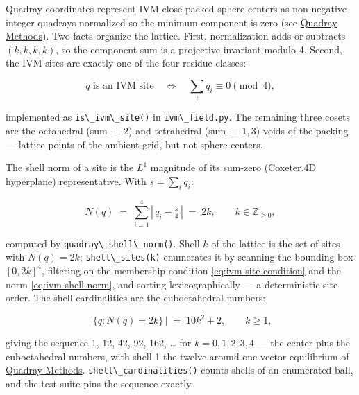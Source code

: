 \documentclass[
  10pt,
]{article}
\newcommand{\passthrough}[1]{#1}
\begin{document}
Quadray coordinates represent IVM close-packed sphere centers as
non-negative integer quadrays normalized so the minimum component is
zero (see \href{03_quadray_methods.md}{Quadray Methods}). Two facts
organize the lattice. First, normalization adds or subtracts
\((k,k,k,k)\), so the component sum is a projective invariant modulo 4.
Second, the IVM sites are exactly one of the four residue classes:

\begin{equation}
\label{eq:ivm-site-condition}
q \text{ is an IVM site} \quad\Longleftrightarrow\quad \textstyle\sum_i q_i \equiv 0 \pmod{4},
\end{equation}

implemented as \passthrough{\lstinline!is\_ivm\_site()!} in
\passthrough{\lstinline!ivm\_field.py!}. The remaining three cosets are
the octahedral (sum \(\equiv 2\)) and tetrahedral (sum \(\equiv 1, 3\))
voids of the packing --- lattice points of the ambient grid, but not
sphere centers.

The shell norm of a site is the \(L^1\) magnitude of its sum-zero
(Coxeter.4D hyperplane) representative. With \(s = \sum_i q_i\):

\begin{equation}
\label{eq:ivm-shell-norm}
N(q) \;=\; \sum_{i=1}^{4} \left|\, q_i - \tfrac{s}{4} \,\right| \;=\; 2k, \qquad k \in \mathbb{Z}_{\geq 0},
\end{equation}

computed by \passthrough{\lstinline!quadray\_shell\_norm()!}. Shell
\(k\) of the lattice is the set of sites with \(N(q) = 2k\);
\passthrough{\lstinline!shell\_sites(k)!} enumerates it by scanning the
bounding box \([0, 2k]^4\), filtering on the membership condition
\eqref{eq:ivm-site-condition} and the norm \eqref{eq:ivm-shell-norm},
and sorting lexicographically --- a deterministic site order. The shell
cardinalities are the cuboctahedral numbers:

\begin{equation}
\label{eq:ivm-shell-cardinality}
\bigl|\, \{ q : N(q) = 2k \} \,\bigr| \;=\; 10k^2 + 2, \qquad k \geq 1,
\end{equation}

giving the sequence 1, 12, 42, 92, 162, \ldots{} for
\(k = 0, 1, 2, 3, 4\) --- the center plus the cuboctahedral numbers,
with shell 1 the twelve-around-one vector equilibrium of
\href{03_quadray_methods.md}{Quadray Methods}.
\passthrough{\lstinline!shell\_cardinalities()!} counts shells of an
enumerated ball, and the test suite pins the sequence exactly.
\end{document}
